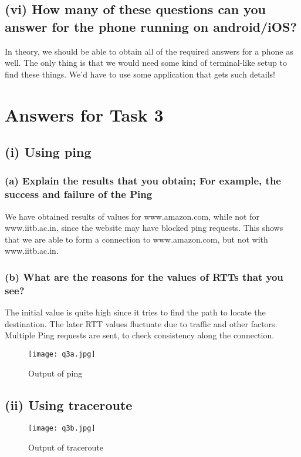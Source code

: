 \documentclass{article}
\begin{document}
\subsection*{(vi) How many of these questions can you answer for the phone running on android/iOS?}
In theory, we should be able to obtain all of the required answers for a phone as well. The only thing is that we would need some kind of terminal-like setup to find these things. We'd have to use some application that gets such details!

\section{Answers for Task 3}
\subsection*{(i) Using ping}
\subsubsection*{(a) Explain the results that you obtain; For example, the success and failure of the Ping}
We have obtained results of values for www.amazon.com, while not for www.iitb.ac.in, since the website may have blocked ping requests. This shows that we are able to form a connection to www.amazon.com, but not with www.iitb.ac.in.

\subsubsection*{(b) What are the reasons for the values of RTTs that you see?}
The initial value is quite high since it tries to find the path to locate the destination. The later RTT values fluctuate due to traffic and other factors. Multiple Ping requests are sent, to check consistency along the connection.

\begin{figure}[!hbt]
    \centering
    \texttt{[image: q3a.jpg]}
    \caption{Output of ping}
    \label{fig:my_lmnknabel2d}
\end{figure}

\vspace{-0.75cm}
\subsection*{(ii) Using traceroute}
\begin{figure}[!hbt]
    \centering
    \texttt{[image: q3b.jpg]}
    \caption{Output of traceroute}
    \label{fig:my_labelgjj}
\end{figure}
\end{document}
